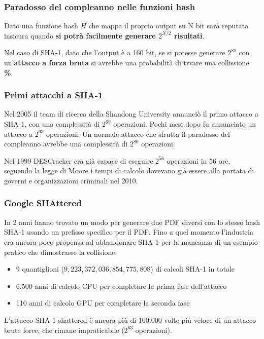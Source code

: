 \begin{frame}
\frametitle{Paradosso del compleanno nelle funzioni hash}

Dato una funzione hash \(H\) che mappa il proprio output su N bit sarà reputata insicura quando \textbf{si potrà facilmente generare $2^{N/2}$ risultati}.

\vspace{1cm}

Nel caso di SHA-1, dato che l'output è a 160 bit, se si potesse generare $2^{80}$ con un'\textbf{attacco a forza bruta} si avrebbe una probabilità di trvare una collissione \textbf{\%}.
\end{frame}


\begin{frame}
\frametitle{Primi attacchi a SHA-1}
Nel 2005 il team di ricerca della Shandong University annunciò il primo attacco a SHA-1, con una complessità di \(2^{69}\) operazioni. Pochi mesi dopo fu annunciato un attacco a \(2^{63}\) operazioni.
Un normale attacco che sfrutta il paradosso del compleanno avrebbe una complessità di \(2^{80}\) operazioni.

\vspace{1cm}

Nel 1999 DESCracker era già capace di eseguire \(2^{56}\) operazioni in 56 ore, seguendo la legge di Moore i tempi di calcolo dovevano già essere alla portata di governi e organizzazioni criminali nel 2010.
\end{frame}


\begin{frame}
\frametitle{Google SHAttered}

In 2 anni hanno trovato un modo per generare due PDF diversi con lo stesso hash SHA-1 usando un prefisso specifico per il PDF.
Fino a quel momento l'industria era ancora poco propensa ad abbandonare SHA-1 per la mancanza di un esempio pratico che dimostrasse la collisione.
\begin{itemize}
    \item 9 quantiglioni (\(9,223,372,036,854,775,808\)) di calcoli SHA-1 in totale
    \item 6.500 anni di calcolo CPU per completare la prima fase dell'attacco
    \item 110 anni di calcolo GPU per completare la seconda fase 
\end{itemize}

L'attacco SHA-1 shattered è ancora più di 100.000 volte più veloce di un attacco brute force, che rimane impraticabile (\(2^{63}\) operazioni).
\end{frame}

